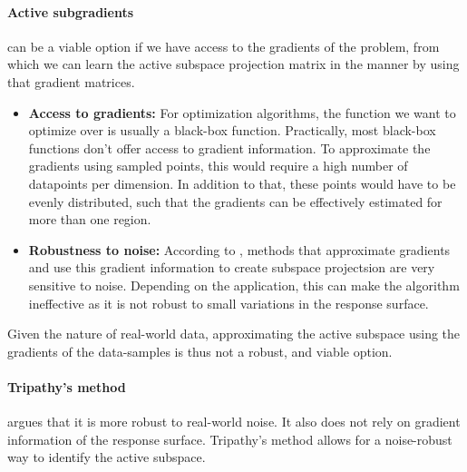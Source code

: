 \paragraph{Active subgradients} can be a viable option if we have access to the gradients of the problem, from which we can learn the active subspace projection matrix in the manner by using that gradient matrices.

\begin{itemize}

\item \textbf{Access to gradients:} For optimization algorithms, the function we want to optimize over is usually a black-box function.
Practically, most black-box functions don't offer access to gradient information.
To approximate the gradients using sampled points, this would require a high number of datapoints per dimension.
In addition to that, these points would have to be evenly distributed, such that the gradients can be effectively estimated for more than one region.

\item \textbf{Robustness to noise:} According to \citep{Tripathy}, methods that approximate gradients and use this gradient information to create subspace projectsion are very sensitive to noise.
Depending on the application, this can make the algorithm ineffective as it is not robust to small variations in the response surface.

\end{itemize}

Given the nature of real-world data, approximating the active subspace using the gradients of the data-samples is thus not a robust, and viable option.

\paragraph{Tripathy's method} argues that it is more robust to real-world noise. 
It also does not rely on gradient information of the response surface.
Tripathy's method allows for a noise-robust way to identify the active subspace.

